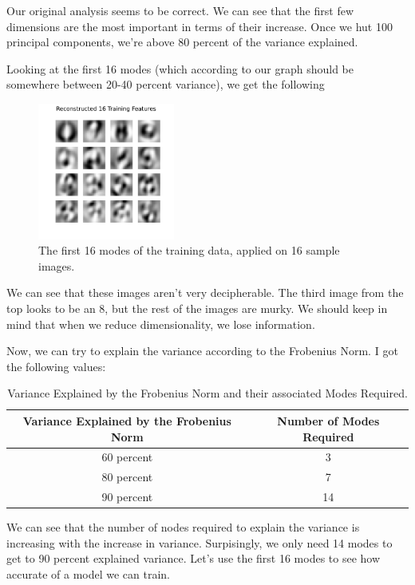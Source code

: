 \documentclass[11pt]{amsart}
\begin{document}
Our original analysis seems to be correct. We can see that the first few dimensions are the most important 
in terms of their increase. Once we hut 100 principal components, we're above 80 percent of the variance explained.

Looking at the first 16 modes (which according to our graph should be somewhere between 20-40 percent variance), we get the following

\begin{figure}[htp]
    \centering
    \includegraphics[width=0.4\textwidth]{./Reconstructed 16 Training Features.pdf}
    \caption{The first 16 modes of the training data, applied on 16 sample images.}
    \label{fig:first-16-training-features}
\end{figure}

We can see that these images aren't very decipherable. The third image from the top looks to be 
an 8, but the rest of the images are murky. We should keep in mind that when we reduce dimensionality, 
we lose information. 

Now, we can try to explain the variance according to the Frobenius Norm. I got the following values:
\begin{table}[htp]
    \centering
    \begin{tabular}{|c|c|}
         \hline
         Variance Explained by the Frobenius Norm & Number of Modes Required \\ \hline
         60 percent & 3  \\ \hline
         80 percent & 7  \\ \hline
         90 percent & 14 \\ \hline
    \end{tabular}
    \caption{Variance Explained by the Frobenius Norm and their associated Modes Required.}
    \label{tab:meaningful-label}
\end{table}

We can see that the number of nodes required to explain the variance is increasing with the increase in variance. Surpisingly, we only need 
14 modes to get to 90 percent explained variance. Let's use the first 16 modes to see how accurate of a model we can train. 
\end{document}
